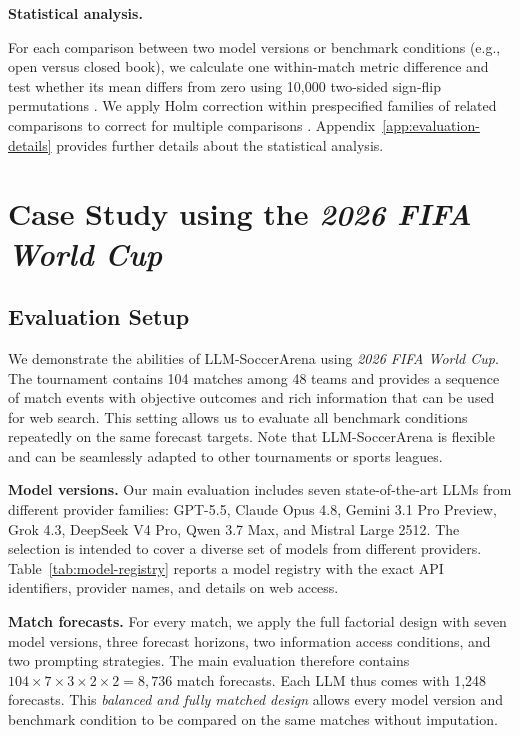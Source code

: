 \documentclass[sigconf,nonacm]{acmart}
\newcommand{\arena}{\mbox{LLM-SoccerArena}\xspace}
\begin{document}
\textbf{Statistical analysis.}

For each comparison between two model versions or benchmark conditions (e.g., open versus closed book), we calculate one within-match metric difference and test whether its mean differs from zero using 10,000 two-sided sign-flip permutations \cite{frauenNonparametricLLMEvaluation2026,konietschkeBootstrappingPermutingPaired2014}. We apply Holm correction within prespecified families of related comparisons to correct for multiple comparisons \cite{holm1979}. Appendix~\ref{app:evaluation-details} provides further details about the statistical analysis.

\section{Case Study using the \emph{2026 FIFA World Cup}}
\subsection{Evaluation Setup}
\label{sec:world-cup-setup}
We demonstrate the abilities of \arena using \emph{2026 FIFA World Cup}. The tournament contains 104 matches among 48 teams and provides a sequence of match events with objective outcomes and rich information that can be used for web search. This setting allows us to evaluate all benchmark conditions repeatedly on the same forecast targets. Note that \arena is flexible and can be seamlessly adapted to other tournaments or sports leagues. 

\textbf{Model versions.} 
Our main evaluation includes seven state-of-the-art LLMs from different provider families: GPT-5.5, Claude Opus 4.8, Gemini 3.1 Pro Preview, Grok 4.3, DeepSeek V4 Pro, Qwen 3.7 Max, and Mistral Large 2512. The selection is intended to cover a diverse set of models from different providers. Table~\ref{tab:model-registry} reports a model registry with the exact API identifiers, provider names, and details on web access. 

\textbf{Match forecasts.} For every match, we apply the full factorial design with seven model versions, three forecast horizons, two information access conditions, and two prompting strategies. The main evaluation therefore contains $104 \times 7 \times 3 \times 2 \times 2 = 8{,}736$ match forecasts. Each LLM thus comes with 1,248 forecasts. This \emph{balanced and fully matched design} allows every model version and benchmark condition to be compared on the same matches without imputation. 
\end{document}
